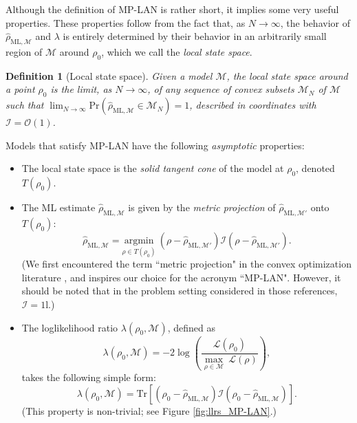 \documentclass[aps,pra, twocolumn]{revtex4-1}
\newcommand{\M}{\mathcal{M}}
\newcommand{\cL}{\mathcal{L}}
\newcommand{\Id}{\mathbb{I}}
\def\Id{1\!\mathrm{l}}
\newcommand{\rhohat}{\hat{\rho}}
\newcommand{\rhoML}[1]{\rhohat_{\scriptscriptstyle{\mathrm{ML},#1}}}
\newtheorem{mydef}{Definition}
\begin{document}
Although the definition of MP-LAN is rather short, it implies some very useful properties. These properties follow from the fact that, as $N \rightarrow \infty$, the behavior of $\rhoML{\M}$ and $\lambda$ is entirely determined by their behavior in an arbitrarily small region of $\M$ around $\rho_{0}$, which we call the \emph{local state space}.

\begin{mydef}[Local state space]
Given a model $\M$, the local state space around a point $\rho_{0}$ is the limit, as $N \rightarrow \infty$, of any sequence of convex subsets $\M_{N}$ of $\M$ such that $\lim_{N\rightarrow \infty}\mathrm{Pr}(\rhoML{\M} \in \M_{N}) =1$, described in coordinates with $\mathcal{I} = \mathcal{O}(1)$.
\end{mydef}

Models that satisfy MP-LAN have the following \emph{asymptotic} properties:
\begin{itemize}[nosep]
\item The local state space is the \emph{solid tangent cone} of the model at $\rho_{0}$, denoted $T(\rho_{0})$.
\item The ML estimate $\rhoML{\M}$ is given by the \emph{metric projection} of $\rhoML{\M'}$ onto $T(\rho_{0})$:
\begin{equation}
\label{eq:MP-LANmle}
\rhoML{\M} = \underset{\rho \in T(\rho_{0})}{\text{argmin}}~(\rho  -\rhoML{\M'})\mathcal{I}(\rho  -\rhoML{\M'}).
\end{equation}
(We first encountered the term ``metric projection" in the convex optimization literature \cite{McCoy2014, Amelunxen2014}, and inspires our choice for the acronym ``MP-LAN". However, it should be noted that in the problem setting considered in those references, $\mathcal{I} = \Id$.)

\item The loglikelihood ratio $\lambda(\rho_{0}, \M)$, defined as
\begin{equation}
\label{eq:llrs_lan_2}
\lambda(\rho_{0}, \M) = -2 \log \left(\frac{\cL(\rho_{0})}{\underset{\rho \in \M}{\max}~\cL(\rho)}\right),
\end{equation}
takes the following simple form:
\begin{equation}
\label{eq:llrs_lan}
\lambda(\rho_{0}, \M) =  \mathrm{Tr}[(\rho_{0} - \rhoML{\M})\mathcal{I}(\rho_{0} - \rhoML{\M})].
\end{equation}
(This property is non-trivial; see Figure \ref{fig:llrs_MP-LAN}.)
\end{itemize}
\end{document}
